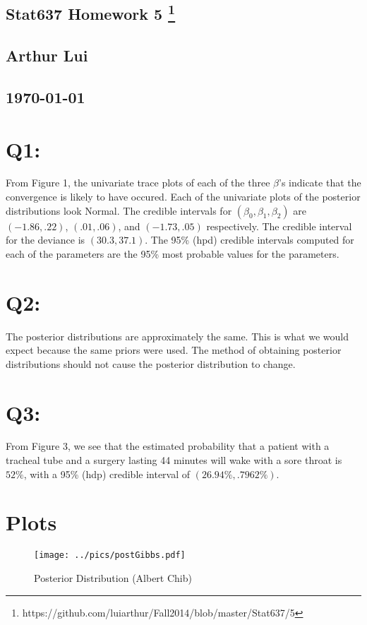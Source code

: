 \documentclass{article}
\def\beginmyfig{\begin{figure}[htbp]\begin{center}}
\def\endmyfig{\end{center}\end{figure}}
\begin{document}
\begin{center}
  \section*{\textbf{Stat637 Homework 5}
    \footnote{https://github.com/luiarthur/Fall2014/blob/master/Stat637/5}
  }  
  \subsection*{\textbf{Arthur Lui}}
  \subsection*{\noindent\today}
\end{center}


\section{Q1:}
From Figure 1, the univariate trace plots of each of the three $\beta$'s
indicate that the convergence is likely to have occured. Each of the univariate
plots of the posterior distributions look Normal. The credible intervals for
$(\beta_0,\beta_1,\beta_2)$ are $(-1.86,.22)$, $(.01,.06)$, and $(-1.73, .05)$ 
respectively. The credible interval for the deviance is $(30.3,37.1)$.
The 95\% (hpd) credible intervals computed for each of the parameters are the 
95\% most probable values for the parameters. 

\section{Q2:}
The posterior distributions are approximately the same. This is what we would expect
because the same priors were used. The method of obtaining posterior distributions
should not cause the posterior distribution to change.

\section{Q3:}
From Figure 3, we see that the estimated probability that a patient with a tracheal
tube and a surgery lasting 44 minutes will wake with a sore throat is $52\%$, with
a 95\% (hdp) credible interval of $(26.94\%,.7962\%)$.

\section{Plots}
\beginmyfig
  \caption{Posterior Distribution (Albert Chib)}
  \texttt{[image: ../pics/postGibbs.pdf]}
\endmyfig
\end{document}
